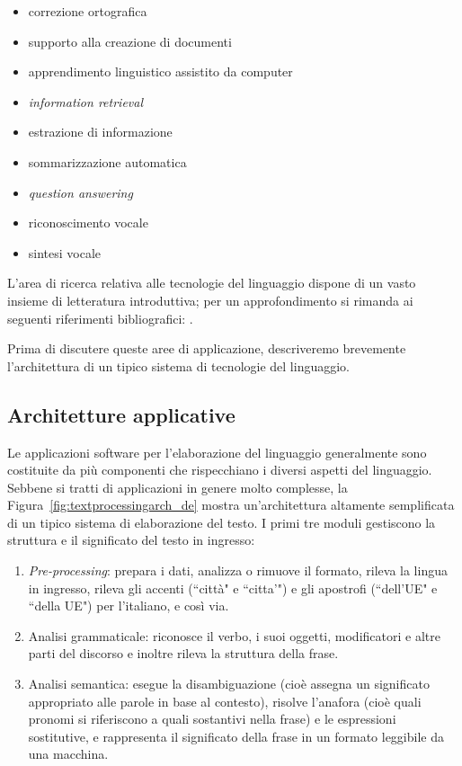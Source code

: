 \begin{multicols}{2}
\begin{itemize}
\item correzione ortografica
\item supporto alla creazione di documenti
\item apprendimento linguistico assistito da computer
\item \emph{information retrieval}
\item estrazione di informazione
\item sommarizzazione automatica
\item \emph{question answering}
\item riconoscimento vocale 
\item sintesi vocale
\end{itemize}

L'area di ricerca relativa alle tecnologie del linguaggio dispone
di un vasto insieme di letteratura introduttiva; per un approfondimento 
si rimanda ai seguenti riferimenti bibliografici:  
\cite{carstensen-etal1, jurafsky-martin01, manning-schuetze1,  lt-world1, lt-survey1}.

Prima di discutere queste aree di applicazione, descriveremo brevemente
l'architettura di un tipico sistema di tecnologie del linguaggio.

\subsection{Architetture applicative}

Le applicazioni software per l'elaborazione del linguaggio generalmente sono
costituite da pi\`{u} componenti che rispecchiano i diversi aspetti del
linguaggio. Sebbene si tratti di applicazioni in genere molto complesse, la 
Figura~\ref{fig:textprocessingarch_de} mostra un'architettura altamente 
semplificata di un tipico sistema di elaborazione del testo. I primi tre
moduli gestiscono la struttura e il significato del testo in ingresso:

\begin{enumerate}
\item \emph{Pre-processing}: prepara i dati, analizza o rimuove il formato, rileva la lingua in ingresso, rileva gli accenti (“citt\`{a}" e “citta'") e gli apostrofi (“dell'UE" e “della UE") per l'italiano, e cos\`{i} via.
\item Analisi grammaticale: riconosce il verbo, i suoi oggetti, modificatori e altre parti del discorso e inoltre rileva la struttura della frase.
\item Analisi semantica: esegue la disambiguazione (cio\`{e} assegna un significato appropriato alle parole in base al contesto), risolve l'anafora (cio\`{e} quali pronomi si riferiscono a quali sostantivi nella frase) e le espressioni sostitutive, e rappresenta il significato della frase in un formato leggibile da una macchina.
\end{enumerate}


\end{multicols}

